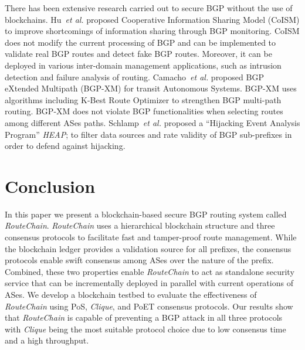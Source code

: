 \documentclass[5p]{elsarticle}
\newcommand{\BfPara}[1]{{\noindent\bf#1.}\xspace}
\newcommand{\rc}{{{\em RouteChain}}\xspace}
\newcommand{\etal}{{\em et al.}\xspace}
\begin{document}
There has been extensive research carried out to secure BGP without the use of blockchains. Hu~\etal\cite{HuWL15} proposed Cooperative Information Sharing Model (CoISM) to improve shortcomings of information sharing through BGP monitoring. CoISM does not modify the current processing of BGP and can be implemented to validate real BGP routes and detect fake BGP routes. Moreover, it can be deployed in various inter-domain management applications, such as intrusion detection and failure analysis of routing. Camacho~\etal\cite{CamachoGBV13} proposed BGP eXtended Multipath (BGP-XM) for transit Autonomous Systems. BGP-XM uses algorithms including K-Best Route Optimizer  to strengthen BGP multi-path routing. BGP-XM does not violate BGP functionalities when selecting routes among different ASes paths. Schlamp~\etal\cite{SchlampHJCB16} proposed a ``Hijacking Event Analysis Program'' {\em HEAP}; to filter data sources and rate validity of BGP sub-prefixes in order to defend against hijacking. 





\section{Conclusion}\label{sec:conclusion}
In this paper we present a blockchain-based secure BGP routing system called \rc. \rc uses a hierarchical blockchain structure and three consensus protocols to facilitate fast and tamper-proof route management. While the blockchain ledger provides a validation source for all prefixes, the consensus protocols enable swift consensus among ASes over the nature of the prefix. Combined, these two properties enable \rc to act as standalone security service that can be incrementally deployed in parallel with current operations of ASes. We develop a blockchain testbed to evaluate the effectiveness of \rc using PoS, {\em Clique}, and PoET consensus protocols. Our results show that \rc is capable of preventing a BGP attack in all three protocols with {\em Clique} being the most suitable protocol choice due to low consensus time and a high throughput. 







\end{document}

